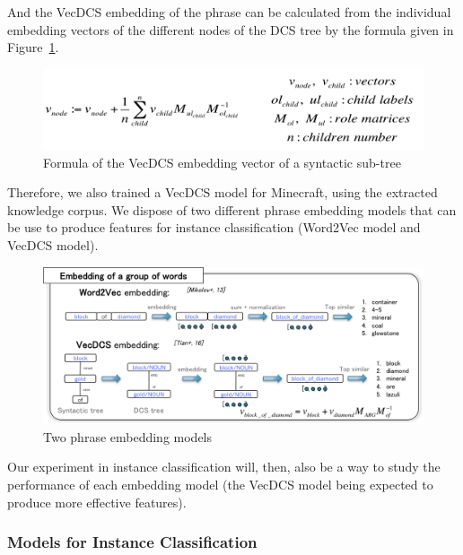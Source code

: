 \documentclass[twocolumn]{article}
\begin{document}
And the VecDCS embedding of the phrase can be calculated from the individual embedding vectors of the different nodes of the DCS tree by the formula given in Figure~\ref{vecDCSFormula}.

\begin{figure}[t]
   \centering \includegraphics[width=\linewidth]{Figures/Semantic_Parsing/vecDCS.png}
   \caption{\label{vecDCSFormula} Formula of the VecDCS embedding vector of a syntactic sub-tree}
\end{figure}

Therefore, we also trained a VecDCS model for Minecraft, using the extracted knowledge corpus.
We dispose of two different phrase embedding models that can be use to produce features for instance classification (Word2Vec model and VecDCS model).

\begin{figure}[t]
   \centering \includegraphics[width=\linewidth]{Figures/Semantic_Parsing/groupWordEmbedding.png}
   \caption{\label{groupWordEmbedding} Two phrase embedding models}
\end{figure}

Our experiment in instance classification will, then, also be a way to study the performance of each embedding model (the VecDCS model being expected to produce more effective features).

\subsubsection{Models for Instance Classification}
\end{document}
